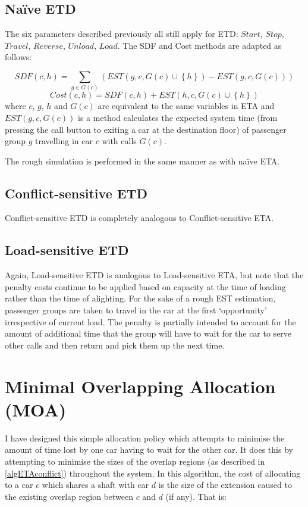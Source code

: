 \documentclass{UoYCSproject}
\begin{document}
\subsection{Na\"{i}ve ETD}

The six parameters described previously all still apply for ETD: $Start$, $Stop$, $Travel$, $Reverse$, $Unload$, $Load$.  The SDF and Cost methods are adapted as follows:

\[ SDF(c, h) = \sum\limits_{g \in G(c)} (EST(g, c, G(c) \cup \left\{ h \right\}) - EST(g, c, G(c)))\]
\[ Cost(c, h) = SDF(c, h) + EST(h, c, G(c) \cup \left\{ h \right\}) \]
where $c$, $g$, $h$ and $G(c)$ are equivalent to the same variables in ETA and $EST(g,c,G(c))$ is a method calculates the expected system time (from pressing the call button to exiting a car at the destination floor) of passenger group $g$ travelling in car $c$ with calls $G(c)$.

The rough simulation is performed in the same manner as with na\"{i}ve ETA.

\subsection{Conflict-sensitive ETD}

Conflict-sensitive ETD is completely analogous to Conflict-sensitive ETA.

\subsection{Load-sensitive ETD}

Again, Load-sensitive ETD is analogous to Load-sensitive ETA, but note that the penalty costs continue to be applied based on capacity at the time of loading rather than the time of alighting.  For the sake of a rough EST estimation, passenger groups are taken to travel in the car at the first `opportunity' irrespective of current load.  The penalty is partially intended to account for the amount of additional time that the group will have to wait for the car to serve other calls and then return and pick them up the next time.

\section{Minimal Overlapping Allocation (MOA)}

I have designed this simple allocation policy which attempts to minimise the amount of time lost by one car having to wait for the other car.  It does this by attempting to minimise the sizes of the overlap regions (as described in \autoref{algETAconflict}) throughout the system.  In this algorithm, the cost of allocating to a car $c$ which shares a shaft with car $d$ is the size of the extension caused to the existing overlap region between $c$ and $d$ (if any).  That is:
\end{document}

